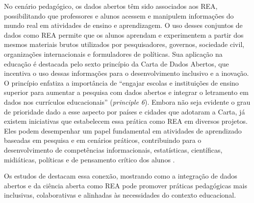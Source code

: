 \documentclass[portuguese]{textolivre}
\begin{document}
No cenário pedagógico, os dados abertos têm sido associados aos REA, possibilitando que professores e alunos acessem e manipulem informações do mundo real em atividades de ensino e aprendizagem. O uso desses conjuntos de dados como REA permite que os alunos aprendam e experimentem a partir dos mesmos materiais brutos utilizados por pesquisadores, governos, sociedade civil, organizações internacionais e formuladores de políticas. Sua aplicação na educação é destacada pelo sexto princípio da Carta de Dados Abertos, que incentiva o uso dessas informações para o desenvolvimento inclusivo e a inovação. O princípio enfatiza a importância de “engajar escolas e instituições de ensino superior para aumentar a pesquisa com dados abertos e integrar o letramento em dados nos currículos educacionais” \cite{open_data_charter2015} (\textit{principle 6}). Embora não seja evidente o grau de prioridade dado a esse aspecto por países e cidades que adotaram a Carta, já existem iniciativas que estabelecem essa prática como REA em diversos projetos. Eles podem desempenhar um papel fundamental em atividades de aprendizado baseadas em pesquisa e em cenários práticos, contribuindo para o desenvolvimento de competências informacionais, estatísticas, científicas, midiáticas, políticas e de pensamento crítico dos alunos \cite{wolff2015,atenas2019}.

Os estudos de \textcite{atenas2015,lima-lopes2022} destacam essa conexão, mostrando como a integração de dados abertos e da ciência aberta como REA pode promover práticas pedagógicas mais inclusivas, colaborativas e alinhadas às necessidades do contexto educacional.
\end{document}
